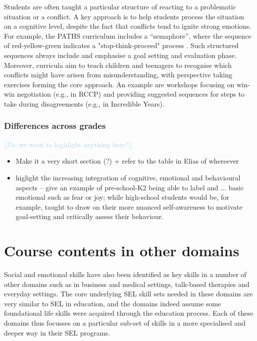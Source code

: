 \documentclass[prodmode,acmtochi]{acmsmall}
\newcommand{\todo}[1]{\textrm{\textrm{\textcolor{LightBlue}{[[#1]]} } } }
\begin{document}
                
                Students are often taught a particular structure of reacting to a problematic situation or a conflict.
%
A key approach is to help students process the situation on a cognitive level, despite the fact that conflicts tend to ignite strong emotions. For example, the PATHS curriculum includes a ``semaphore'', where the sequence of red-yellow-green indicates a "stop-think-proceed" process \cite{Kam2004,Domitrovich2007}. Such structured sequences always include and emphasise a goal setting and evaluation phase. Moreover, curricula aim to teach children and teenagers to recognise which conflicts might have arisen from misunderstanding, with perspective taking exercises forming the core approach. An example are workshops focusing on win-win negotiation (e.g., in RCCP) and providing suggested sequences for steps to take during disagreements (e.g., in Incredible Years).




\subsubsection{Differences across grades}
\todo{Do we want to highlight anything here?}
\begin{itemize}
	\item Make it a very short section (?) + refer to the table in Elias of whereever 
	\item higlight the increasing integration of cognitive, emotional and behavioural aspects -- give an example of pre-school-K2 being able to label and ... basic emotional such as fear or joy; while high-school students would be, for example, taught to draw on their more nuanced self-awareness to motivate goal-setting and critically assess their behaviour.
\end{itemize}






\iffalse
\section{Course contents in other domains}
\label{sec:linkDomains}
Social
and emotional skills have also been identified as key skills in a number of other domains such as in business and medical settings, talk-based therapies and everyday settings. The core underlying SEL skill sets needed in these domains are very similar to SEL in education, and the domains indeed assume some foundational life skills were acquired through the education process. Each of these domains thus focusses on a particular sub-set of skills in a more specialised and deeper way in their SEL programs. %
\end{document}
